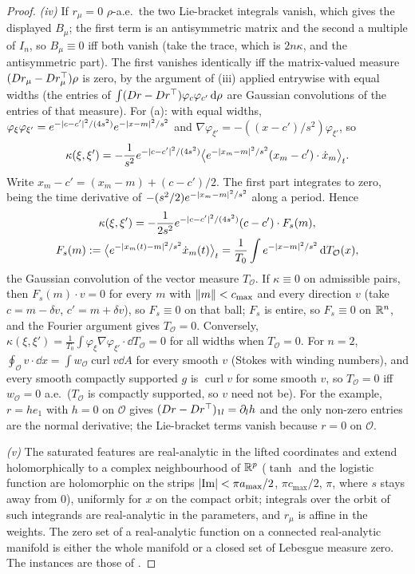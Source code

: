 \begin{proof}
\noindent\emph{(iv)} If $r_\mu=0$ $\rho$-a.e.\ the two Lie-bracket integrals vanish, which gives the displayed
$B_\mu$; the first term is an antisymmetric matrix and the second a multiple of $I_n$, so $B_\mu\equiv0$ iff both
vanish (take the trace, which is $2n\kappa$, and the antisymmetric part). The first vanishes identically iff the
matrix-valued measure $(Dr_\mu-Dr_\mu^\top)\rho$ is zero, by the argument of (iii) applied entrywise with equal widths
(the entries of $\int(Dr-Dr^\top)\varphi_c\varphi_{c'}\,\mathrm{d}\rho$ are Gaussian convolutions of the entries of that
measure). For (a): with equal widths, $\varphi_\xi\varphi_{\xi'}=e^{-\lvert c-c'\rvert^2/(4s^2)}e^{-\lvert x-m\rvert^2/s^2}$ and
$\nabla\varphi_{\xi'}=-((x-c')/s^2)\varphi_{\xi'}$, so
\[
  \kappa(\xi,\xi')=-\frac{1}{s^2}e^{-\lvert c-c'\rvert^2/(4s^2)}
  \bigl\langle e^{-\lvert x_m-m\rvert^2/s^2}(x_m-c')\cdot\dot x_m\bigr\rangle_t.
\]
Write $x_m-c'=(x_m-m)+(c-c')/2$. The first part integrates to zero, being the time derivative of
$-(s^2/2)e^{-\lvert x_m-m\rvert^2/s^2}$ along a period. Hence
\begin{gather*}
  \kappa(\xi,\xi')=-\frac{1}{2s^2}e^{-\lvert c-c'\rvert^2/(4s^2)}(c-c')\cdot F_s(m),\\
  F_s(m):=\bigl\langle e^{-\lvert x_m(t)-m\rvert^2/s^2}\dot x_m(t)\bigr\rangle_t
  =\frac{1}{T_0}\int e^{-\lvert x-m\rvert^2/s^2}\,\mathrm{d} T_{\mathcal{O}}(x),
\end{gather*}
the Gaussian convolution of the vector measure $T_{\mathcal{O}}$. If $\kappa\equiv0$ on admissible pairs, then
$F_s(m)\cdot v=0$ for every $m$ with $\lVert m\rVert<c_{\max}$ and every direction $v$ (take $c=m-\delta v$,
$c'=m+\delta v$), so $F_s\equiv0$ on that ball; $F_s$ is entire, so $F_s\equiv0$ on $\mathbb{R}^n$, and the Fourier argument
gives $T_{\mathcal{O}}=0$. Conversely,
$\kappa(\xi,\xi')=\frac{1}{T_0}\int\varphi_\xi\nabla\varphi_{\xi'}\cdot\dd T_{\mathcal{O}}=0$ for all widths when
$T_{\mathcal{O}}=0$. For $n=2$, $\oint_{\mathcal{O}}v\cdot\dd x=\int w_{\mathcal{O}}\operatorname{curl}v\dd A$ for
every smooth $v$ (Stokes with winding numbers), and every smooth compactly supported $g$ is $\operatorname{curl}v$ for
some smooth $v$, so $T_{\mathcal{O}}=0$ iff $w_{\mathcal{O}}=0$ a.e.\ ($T_{\mathcal{O}}$ is compactly supported, so
$v$ need not be). For the example, $r=he_1$ with $h=0$ on $\mathcal{O}$ gives $(Dr-Dr^\top)_{1l}=\partial_lh$ and the
only non-zero entries are the normal derivative; the Lie-bracket terms vanish because $r=0$ on $\mathcal{O}$.

\noindent\emph{(v)} The saturated features are real-analytic in the lifted coordinates and extend holomorphically to
a complex neighbourhood of $\mathbb{R}^p$ ($\tanh$ and the logistic function are holomorphic on the strips
$\lvert \operatorname{Im}\rvert<\pi a_{\max}/2$, $\pi c_{\max}/2$, $\pi$, where $s$ stays away from $0$), uniformly for $x$
on the compact orbit; integrals over the orbit of such integrands are real-analytic in the parameters, and $r_\mu$ is
affine in the weights. The zero set of a real-analytic function on a connected real-analytic manifold is either the
whole manifold or a closed set of Lebesgue measure zero. The instances are those of\newline
{}.


\end{proof}
